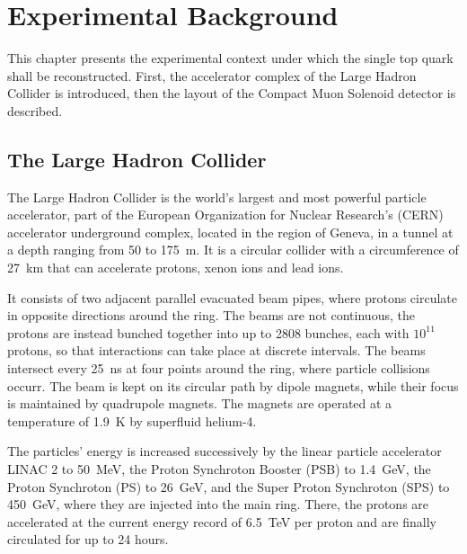 \chapter{Experimental Background}
\label{ch:experiment}
This chapter presents the experimental context under which the single top quark shall be reconstructed. First, the accelerator complex of the Large Hadron Collider is introduced, then the layout of the Compact Muon Solenoid detector is described.

\section{The Large Hadron Collider}
The Large Hadron Collider is the world's largest and most powerful particle accelerator, part of the European Organization for Nuclear Research's (CERN) accelerator underground complex, located in the region of Geneva, in a tunnel at a depth ranging from 50 to \SI{175}{m}. It is a circular collider with a circumference of \SI{27}{km} that can accelerate protons, xenon ions and lead ions.

It consists of two adjacent parallel evacuated beam pipes, where protons circulate in opposite directions around the ring. The beams are not continuous, the protons are instead bunched together into up to 2808 bunches, each with $10^{11}$ protons, so that interactions can take place at discrete intervals. The beams intersect every \SI{25}{ns} at four points around the ring, where particle collisions occurr. The beam is kept on its circular path by dipole magnets, while their focus is maintained by quadrupole magnets. The magnets are operated at a temperature of \SI{1.9}{K} by superfluid helium-4.

The particles' energy is increased successively by the linear particle accelerator LINAC 2 to \SI{50}{MeV}, the Proton Synchroton Booster (PSB) to \SI{1.4}{GeV}, the Proton Synchroton (PS) to \SI{26}{GeV}, and the Super Proton Synchroton (SPS) to \SI{450}{GeV}, where they are injected into the main ring. There, the protons are accelerated at the current energy record of \SI{6.5}{TeV} per proton and are finally circulated for up to 24 hours.

